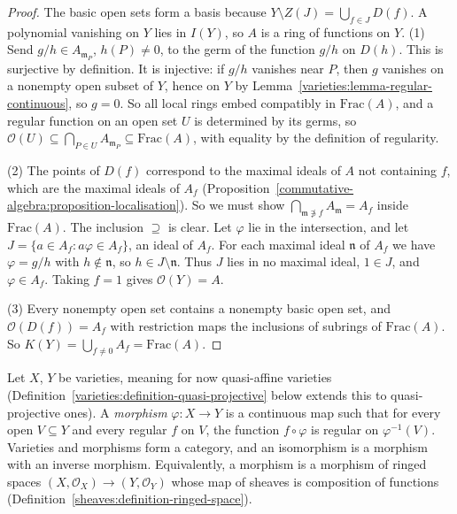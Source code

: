 \begin{proof}
The basic open sets form a basis because $Y \setminus Z(J) = \bigcup_{f \in J}D(f)$. A polynomial vanishing on $Y$ lies in $I(Y)$, so $A$ is a ring of
functions on $Y$. (1) Send $g/h \in A_{\mathfrak{m}_P}$, $h(P) \neq 0$, to the germ of the function $g/h$ on $D(h)$. This is surjective by definition. It
is injective: if $g/h$ vanishes near $P$, then $g$ vanishes on a nonempty open subset of $Y$, hence on $Y$ by
Lemma~\ref{varieties:lemma-regular-continuous}, so $g = 0$. So all local rings embed compatibly in $\mathrm{Frac}(A)$, and a regular function on
an open set $U$ is determined by its germs, so $\mathcal{O}(U) \subseteq \bigcap_{P \in U}A_{\mathfrak{m}_P} \subseteq \mathrm{Frac}(A)$, with
equality by the definition of regularity.

(2) The points of $D(f)$ correspond to the maximal ideals of $A$ not containing $f$, which are the maximal ideals of $A_f$
(Proposition~\ref{commutative-algebra:proposition-localisation}). So we must show $\bigcap_{\mathfrak{m} \not\ni f}A_\mathfrak{m} = A_f$ inside
$\mathrm{Frac}(A)$. The inclusion $\supseteq$ is clear. Let $\varphi$ lie in the intersection, and let $J = \{a \in A_f : a\varphi \in A_f\}$, an
ideal of $A_f$. For each maximal ideal $\mathfrak{n}$ of $A_f$ we have $\varphi = g/h$ with $h \notin \mathfrak{n}$, so $h \in J \setminus \mathfrak{n}$. Thus
$J$ lies in no maximal ideal, $1 \in J$, and $\varphi \in A_f$. Taking $f = 1$ gives $\mathcal{O}(Y) = A$.

(3) Every nonempty open set contains a nonempty basic open set, and $\mathcal{O}(D(f)) = A_f$ with restriction maps the inclusions of
subrings of $\mathrm{Frac}(A)$. So $K(Y) = \bigcup_{f \neq 0}A_f = \mathrm{Frac}(A)$.
\end{proof}

\begin{definition}\label{varieties:definition-morphism}
Let $X$, $Y$ be varieties, meaning for now quasi-affine varieties (Definition~\ref{varieties:definition-quasi-projective} below extends
this to quasi-projective ones). A \emph{morphism} $\varphi \colon X \to Y$ is a continuous map such that for every open $V \subseteq Y$ and every
regular $f$ on $V$, the function $f \circ \varphi$ is regular on $\varphi^{-1}(V)$. Varieties and morphisms form a category, and an isomorphism is
a morphism with an inverse morphism. Equivalently, a morphism is a morphism of ringed spaces $(X, \mathcal{O}_X) \to (Y, \mathcal{O}_Y)$ whose
map of sheaves is composition of functions (Definition~\ref{sheaves:definition-ringed-space}).
\end{definition}

